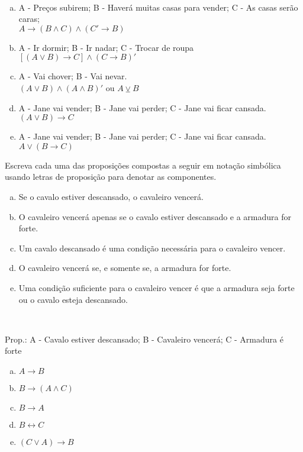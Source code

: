 \documentclass[a4paper, 12pt, addpoints]{exam}
\begin{document}
\begin{questions}
  \begin{resp}~
    \begin{enumerate}[a)]
      \item A - Preços subirem; B - Haverá muitas casas para vender; C - As casas serão caras; \\ $ A \rightarrow (B \wedge C) \wedge (C' \rightarrow B) $
      \item A - Ir dormir; B - Ir nadar; C - Trocar de roupa \\ $[(A \vee B) \rightarrow C] \wedge (C \rightarrow B)'$
      \item A - Vai chover; B - Vai nevar. \\ $(A \vee B) \wedge (A \wedge B)'$ ou $ A \veebar B $
      \item A - Jane vai vender; B - Jane vai perder; C - Jane vai ficar cansada. \\ $(A \vee B) \rightarrow C$
      \item A - Jane vai vender; B - Jane vai perder; C - Jane vai ficar cansada. \\ $A \vee (B \rightarrow C)$
      
    \end{enumerate}
  \end{resp}

  \question Escreva cada uma das proposições compostas a seguir em notação simbólica usando
  letras de proposição para denotar as componentes.

  \begin{enumerate}[a)]
    \item Se o cavalo estiver descansado, o cavaleiro vencerá.
    \item O cavaleiro vencerá apenas se o cavalo estiver descansado e a armadura for
          forte.
    \item Um cavalo descansado é uma condição necessária para o cavaleiro vencer.
    \item O cavaleiro vencerá se, e somente se, a armadura for forte.
    \item Uma condição suficiente para o cavaleiro vencer é que a armadura seja forte
          ou o cavalo esteja descansado.
  \end{enumerate}

  \begin{resp}~

    Prop.: A - Cavalo estiver descansado; B - Cavaleiro vencerá; C - Armadura é forte
    
    \begin{multicols}{4}
    \begin{enumerate}[a)]
      \item $ A \rightarrow B$
      \item $B \rightarrow (A \wedge C)$
      \item $B \rightarrow A$
      \item $B \leftrightarrow C$
      \item $(C \vee A) \rightarrow B$
    \end{enumerate}
  \end{multicols}
  \end{resp}


\end{questions}
\end{document}

